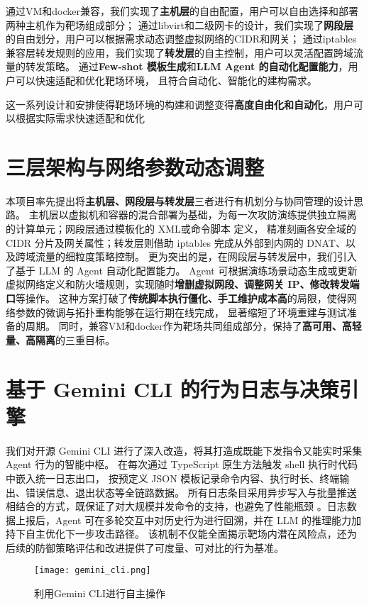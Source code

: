 \documentclass[lang=cn,10pt]{elegantbook}
\begin{document}
通过VM和docker兼容，我们实现了\textbf{主机层}的自由配置，用户可以自由选择和部署两种主机作为靶场组成部分；
通过libvirt和二级网卡的设计，我们实现了\textbf{网段层}的自由划分，用户可以根据需求动态调整虚拟网络的CIDR和网关；
通过iptables兼容层转发规则的应用，我们实现了\textbf{转发层}的自主控制，用户可以灵活配置跨域流量的转发策略。
通过\textbf{Few-shot 模板生成}和\textbf{LLM Agent 的自动化配置能力}，用户可以快速适配和优化靶场环境，
且符合自动化、智能化的建构需求。


这一系列设计和安排使得靶场环境的构建和调整变得\textbf{高度自由化和自动化}，用户可以根据实际需求快速适配和优化




\section{三层架构与网络参数动态调整}  
本项目率先提出将\textbf{主机层、网段层与转发层}三者进行有机划分与协同管理的设计思路。
主机层以虚拟机和容器的混合部署为基础，为每一次攻防演练提供独立隔离的计算单元；网段层通过模板化的 XML或命令脚本 定义，
精准刻画各安全域的 CIDR 分片及网关属性；转发层则借助 iptables 完成从外部到内网的 DNAT、以及跨域流量的细粒度策略控制。
更为突出的是，在网段层与转发层中，我们引入了基于 LLM 的 Agent 自动化配置能力。
Agent 可根据演练场景动态生成或更新虚拟网络定义和防火墙规则，实现随时\textbf{增删虚拟网段、调整网关 IP、修改转发端口}等操作。
这种方案打破了\textbf{传统脚本执行僵化、手工维护成本高}的局限，使得网络参数的微调与拓扑重构能够在运行期在线完成，
显著缩短了环境重建与测试准备的周期。
同时，兼容VM和docker作为靶场共同组成部分，保持了\textbf{高可用、高轻量、高隔离}的三重目标。

\section{基于 Gemini CLI 的行为日志与决策引擎}  
我们对开源 Gemini CLI 进行了深入改造，将其打造成既能下发指令又能实时采集 Agent 行为的智能中枢。
在每次通过 TypeScript 原生方法触发 shell 执行时代码中嵌入统一日志出口，
按预定义 JSON 模板记录命令内容、执行时长、终端输出、错误信息、退出状态等全链路数据。
所有日志条目采用异步写入与批量推送相结合的方式，既保证了对大规模并发命令的支持，也避免了性能瓶颈
。日志数据上报后，Agent 可在多轮交互中对历史行为进行回溯，并在 LLM 的推理能力加持下自主优化下一步攻击路径。
该机制不仅能全面揭示靶场内潜在风险点，还为后续的防御策略评估和改进提供了可度量、可对比的行为基准。
\begin{figure}[!h]
\centering
\texttt{[image: gemini\_cli.png]}  %
\caption{利用Gemini CLI进行自主操作}  %
\label{fig:Gemini}  %
\end{figure}
\end{document}
